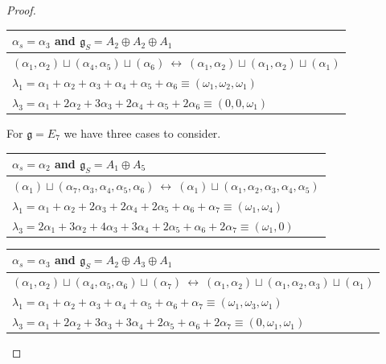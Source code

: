 \documentclass[a4paper, 12pt, reqno, english]{amsart}
\numberwithin{equation}{section}
\numberwithin{figure}{section}
\theoremstyle{plain}
\theoremstyle{plain}
\theoremstyle{plain}
\theoremstyle{plain}
\theoremstyle{plain}
\theoremstyle{definition}
\theoremstyle{definition}
\theoremstyle{definition}
\theoremstyle{remark}
\theoremstyle{definition}
\theoremstyle{definition}
\newcommand{\lieg}{\mathfrak{g}}
\begin{document}
\begin{proof}
{\renewcommand{\arraystretch}{1.4}
\begin{center}
\begin{tabular}{|l|} 
\hline
$\alpha_s = \alpha_3$ and $\lieg_S = A_2 \oplus A_2 \oplus A_1$ \\
\hline \hline
$(\alpha_1, \alpha_2) \sqcup (\alpha_4, \alpha_5) \sqcup (\alpha_6) \ \leftrightarrow \ (\alpha_1, \alpha_2) \sqcup (\alpha_1, \alpha_2) \sqcup (\alpha_1)$ \\
\hline
$\lambda_1 = \alpha_1 + \alpha_2 + \alpha_3 + \alpha_4 + \alpha_5 + \alpha_6 \equiv (\omega_1, \omega_2, \omega_1)$ \\
\hline
$\lambda_3 = \alpha_1 + 2 \alpha_2 + 3 \alpha_3 + 2 \alpha_4 + \alpha_5 + 2 \alpha_6 \equiv (0, 0, \omega_1)$ \\
\hline
\end{tabular}
\end{center}}

For $\lieg = E_7$ we have three cases to consider.

{\renewcommand{\arraystretch}{1.4}
\begin{center}
\begin{tabular}{|l|} 
\hline
$\alpha_s = \alpha_2$ and $\lieg_S = A_1 \oplus A_5$ \\
\hline \hline
$(\alpha_1) \sqcup (\alpha_7, \alpha_3, \alpha_4, \alpha_5, \alpha_6) \ \leftrightarrow \ (\alpha_1) \sqcup (\alpha_1, \alpha_2, \alpha_3, \alpha_4, \alpha_5)$ \\
\hline
$\lambda_1 = \alpha_1 + \alpha_2 + 2 \alpha_3 + 2 \alpha_4 + 2 \alpha_5 + \alpha_6 + \alpha_7 \equiv (\omega_1, \omega_4)$ \\
\hline
$\lambda_3 = 2 \alpha_1 + 3 \alpha_2 + 4 \alpha_3 + 3 \alpha_4 + 2 \alpha_5 + \alpha_6 + 2 \alpha_7 \equiv (\omega_1, 0)$ \\
\hline
\end{tabular}
\end{center}}

{\renewcommand{\arraystretch}{1.4}
\begin{center}
\begin{tabular}{|l|} 
\hline
$\alpha_s = \alpha_3$ and $\lieg_S = A_2 \oplus A_3 \oplus A_1$ \\
\hline \hline
$(\alpha_1, \alpha_2) \sqcup (\alpha_4, \alpha_5, \alpha_6) \sqcup (\alpha_7) \ \leftrightarrow \ (\alpha_1, \alpha_2) \sqcup (\alpha_1, \alpha_2, \alpha_3) \sqcup (\alpha_1)$ \\
\hline
$\lambda_1 = \alpha_1 + \alpha_2 + \alpha_3 + \alpha_4 + \alpha_5 + \alpha_6 + \alpha_7 \equiv (\omega_1, \omega_3, \omega_1)$ \\
\hline
$\lambda_3 = \alpha_1 + 2 \alpha_2 + 3 \alpha_3 + 3 \alpha_4 + 2 \alpha_5 + \alpha_6 + 2 \alpha_7 \equiv (0, \omega_1, \omega_1)$ \\
\hline
\end{tabular}
\end{center}}


\end{proof}
\end{document}

